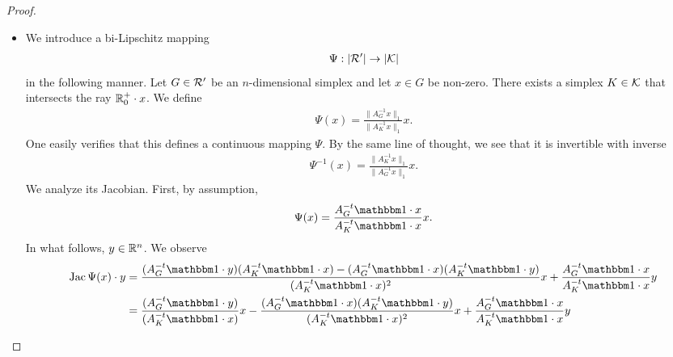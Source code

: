 \documentclass[10pt,letterpaper]{article}
\begin{document}
\begin{proof}
\begin{itemize}
        \item 
        We introduce a bi-Lipschitz mapping 
        \begin{align*}
            \Psi : |{\mathcal R}'| \rightarrow |{\mathcal K}|
        \end{align*}
        in the following manner. Let ${G} \in {\mathcal R}'$ be an $n$-dimensional simplex and let $x \in {G}$ be non-zero. There exists a simplex $K \in {\mathcal K}$ that intersects the ray ${\mathbb R}_0^+ \cdot x$.
        We define 
        \begin{align*}
            \Psi(x) 
            = 
            \frac{ \| A_{{G}}^{-1} x \|_{1} }{ \| A_{K}^{-1} x \|_{1} } x
            .
        \end{align*}
        One easily verifies that this defines a continuous mapping $\Psi$. 
        By the same line of thought, we see that it is invertible with inverse 
        \begin{align*}
            \Psi^{-1}(x) 
            = 
            \frac{ \| A_{K}^{-1} x \|_{1} }{ \| A_{{G}}^{-1} x \|_{1} } x
            .
        \end{align*}
        We analyze its Jacobian. 
        First, by assumption,
        \begin{align*}
            \Psi(x) 
            = 
            \frac{ A_{{G}}^{-t} \vecone \cdot x }{ A_{K}^{-t} \vecone \cdot x } x
            .
        \end{align*}
        In what follows, $y \in {\mathbb R}^n$. We observe 
        \begin{align*}
            \Jacobian \Psi(x) \cdot y 
            &= 
            \frac{ 
                ( A_{{G}}^{-t} \vecone \cdot y ) 
                ( A_{K}^{-t} \vecone \cdot x )
                -
                ( A_{{G}}^{-t} \vecone \cdot x )
                ( A_{K}^{-t} \vecone \cdot y ) 
            }{ 
                ( A_{K}^{-t} \vecone \cdot x )^2
            } 
            x
            + 
            \frac{ A_{{G}}^{-t} \vecone \cdot x }{ A_{K}^{-t} \vecone \cdot x } y
            \\&= 
            \frac{ 
                ( A_{{G}}^{-t} \vecone \cdot y ) 
            }{ 
                ( A_{K}^{-t} \vecone \cdot  x )
            } 
            x
            -
            \frac{ 
                ( A_{{G}}^{-t} \vecone \cdot x )
                ( A_{K}^{-t} \vecone \cdot y ) 
            }{ 
                ( A_{K}^{-t} \vecone \cdot  x )^2
            } 
            x
            + 
            \frac{ A_{{G}}^{-t} \vecone \cdot x }{ A_{K}^{-t} \vecone \cdot  x } y

\end{align*}
\end{itemize}
\end{proof}
\end{document}
